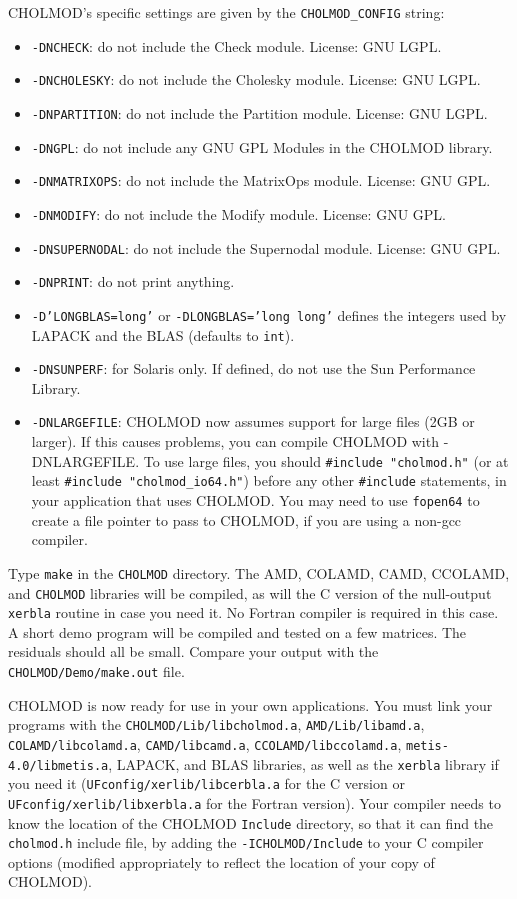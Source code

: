 \documentclass[11pt]{article}
\begin{document}
\noindent
CHOLMOD's specific settings are given by the {\tt CHOLMOD\_CONFIG} string:
\begin{itemize}
\item {\tt -DNCHECK}:	    do not include the Check module.	   License: GNU LGPL.
\item {\tt -DNCHOLESKY}:    do not include the Cholesky module.	   License: GNU LGPL.
\item {\tt -DNPARTITION}:   do not include the Partition module.   License: GNU LGPL.
\item {\tt -DNGPL}:	    do not include any GNU GPL Modules in the CHOLMOD library.
\item {\tt -DNMATRIXOPS}:   do not include the MatrixOps module.   License: GNU GPL.
\item {\tt -DNMODIFY}:	    do not include the Modify module.      License: GNU GPL.
\item {\tt -DNSUPERNODAL}:  do not include the Supernodal module.  License: GNU GPL.
\item {\tt -DNPRINT}:	    do not print anything.
\item {\tt -D'LONGBLAS=long'} or {\tt -DLONGBLAS='long long'}
			    defines the integers used by LAPACK and the BLAS (defaults to {\tt int}).
\item {\tt -DNSUNPERF}:	    for Solaris only.  If defined, do not use the Sun Performance Library.
\item {\tt -DNLARGEFILE}:   CHOLMOD now assumes support for large files (2GB or
larger).  If this causes problems, you can compile CHOLMOD with -DNLARGEFILE.
To use large files, you should {\tt \#include "cholmod.h"} (or at least
{\tt \#include "cholmod\_io64.h"}) before any other {\tt \#include} statements,
in your application that uses CHOLMOD.  You may need to use {\tt fopen64}
to create a file pointer to pass to CHOLMOD, if you are using a non-gcc
compiler.
\end{itemize}

Type {\tt make} in the {\tt CHOLMOD} directory.  The AMD,
COLAMD, CAMD, CCOLAMD, and {\tt CHOLMOD} libraries will be compiled,
as will the C version of the null-output {\tt xerbla} routine in case you need it.
No Fortran compiler is required in this case.  A short demo program will
be compiled and tested on a few matrices.  The residuals should all be small.
Compare your output with the {\tt CHOLMOD/Demo/make.out} file.

CHOLMOD is now ready for use in your own applications.  You must link
your programs with the
{\tt CHOLMOD/Lib/libcholmod.a},
{\tt AMD/Lib/libamd.a},
{\tt COLAMD/libcolamd.a},
{\tt CAMD/libcamd.a}, \newline
{\tt CCOLAMD/libccolamd.a},
{\tt metis-4.0/libmetis.a},
LAPACK,
and
BLAS libraries,
as well as the {\tt xerbla} library if you need it
({\tt UFconfig/xerlib/libcerbla.a} for the C version or
\newline
 {\tt UFconfig/xerlib/libxerbla.a} for the Fortran version).
Your compiler needs to know the location of the CHOLMOD {\tt Include} directory,
so that it can find the {\tt cholmod.h} include file, by
adding the {\tt -ICHOLMOD/Include} to your C compiler options
(modified appropriately to reflect the location of your copy of CHOLMOD).
\end{document}
